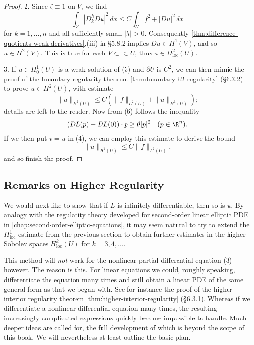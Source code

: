 \begin{proof}
2. Since $\zeta \equiv 1$ on $V$, we find
\[
\int_V |D_k^h Du|^2\, dx \le C\int_U f^2 + |Du|^2\, dx
\]
for $k = 1, \ldots, n$ and all sufficiently small $|h| > 0$. Consequently \cref{thm:difference-quotients-weak-derivatives},(iii) in \S5.8.2 implies $Du \in H^1(V)$, and so $u \in H^2(V)$. This is true for each $V \subset\subset U$; thus $u \in H^2_{\text{loc}}(U)$.

3. If $u \in H_0^1(U)$ is a weak solution of (3) and $\partial U$ is $C^2$, we can then mimic the proof of the boundary regularity theorem \cref{thm:boundary-h2-regularity} (\S6.3.2) to prove $u \in H^2(U)$, with estimate
\[
\|u\|_{H^2(U)} \le C(\|f\|_{L^2(U)} + \|u\|_{H^1(U)});
\]
details are left to the reader. Now from (6) follows the inequality
\[
(DL(p) - DL(0))\cdot p \ge \theta|p|^2 \quad (p \in \R^n).
\]
If we then put $v = u$ in (4), we can employ this estimate to derive the bound
\[
\|u\|_{H^1(U)} \le C\|f\|_{L^2(U)},
\]
and so finish the proof.
\end{proof}

\subsection{Remarks on Higher Regularity}
\label{sec:higher-regularity-remarks}

We would next like to show that if $L$ is infinitely differentiable, then so is $u$. By analogy with the regularity theory developed for second-order linear elliptic PDE in \cref{chap:second-order-elliptic-equations}, it may seem natural to try to extend the $H^1_{\text{loc}}$ estimate from the previous section to obtain further estimates in the higher Sobolev spaces $H^k_{\text{loc}}(U)$ for $k = 3, 4, \ldots$.

This method will \textit{not} work for the nonlinear partial differential equation (3) however. The reason is this. For linear equations we could, roughly speaking, differentiate the equation many times and still obtain a linear PDE of the same general form as that we began with. See for instance the proof of the higher interior regularity theorem \cref{thm:higher-interior-regularity} (\S6.3.1). Whereas if we differentiate a nonlinear differential equation many times, the resulting increasingly complicated expressions quickly become impossible to handle. Much deeper ideas are called for, the full development of which is beyond the scope of this book. We will nevertheless at least outline the basic plan.

